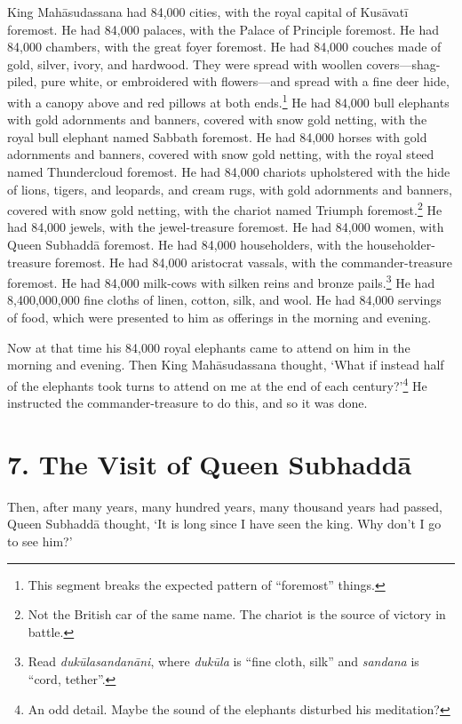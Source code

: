 \documentclass[12pt,openany]{book}%
\begin{document}
King \textsanskrit{Mahāsudassana} had 84,000 cities, with the royal capital of \textsanskrit{Kusāvatī} foremost. He had 84,000 palaces, with the Palace of Principle foremost. He had 84,000 chambers, with the great foyer foremost. He had 84,000 couches made of gold, silver, ivory, and hardwood. They were spread with woollen covers—shag-piled, pure white, or embroidered with flowers—and spread with a fine deer hide, with a canopy above and red pillows at both ends.\footnote{This segment breaks the expected pattern of “foremost” things. } He had 84,000 bull elephants with gold adornments and banners, covered with snow gold netting, with the royal bull elephant named Sabbath foremost. He had 84,000 horses with gold adornments and banners, covered with snow gold netting, with the royal steed named Thundercloud foremost. He had 84,000 chariots upholstered with the hide of lions, tigers, and leopards, and cream rugs, with gold adornments and banners, covered with snow gold netting, with the chariot named Triumph foremost.\footnote{Not the British car of the same name. The chariot is the source of victory in battle. } He had 84,000 jewels, with the jewel-treasure foremost. He had 84,000 women, with Queen \textsanskrit{Subhaddā} foremost. He had 84,000 householders, with the householder-treasure foremost. He had 84,000 aristocrat vassals, with the commander-treasure foremost. He had 84,000 milk-cows with silken reins and bronze pails.\footnote{Read \textit{\textsanskrit{dukūlasandanāni}}, where \textit{\textsanskrit{dukūla}} is “fine cloth, silk” and \textit{sandana} is “cord, tether”. } He had 8,400,000,000 fine cloths of linen, cotton, silk, and wool. He had 84,000 servings of food, which were presented to him as offerings in the morning and evening. 

Now at that time his 84,000 royal elephants came to attend on him in the morning and evening. Then King \textsanskrit{Mahāsudassana} thought, ‘What if instead half of the elephants took turns to attend on me at the end of each century?’\footnote{An odd detail. Maybe the sound of the elephants disturbed his meditation? } He instructed the commander-treasure to do this, and so it was done. 

\section*{7. The Visit of Queen \textsanskrit{Subhaddā} }

Then, after many years, many hundred years, many thousand years had passed, Queen \textsanskrit{Subhaddā} thought, ‘It is long since I have seen the king. Why don’t I go to see him?’ 
\end{document}
